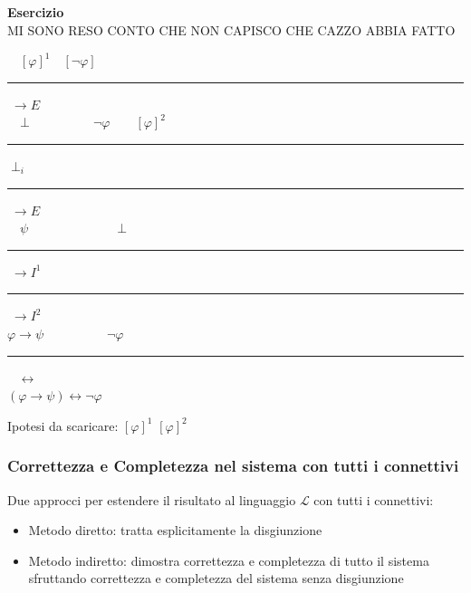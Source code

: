 \documentclass[a4paper, 12pt]{book}
\newcommand{\esercizio}[2][]{%
  \vspace{5pt}%
  \begin{tcolorbox}[%
    colback=white,          %
    colframe=black!70,      %
    arc=2mm,                %
    boxrule=0.5pt,          %
    left=4pt, right=4pt,    %
    top=2pt, bottom=2pt,    %
    breakable               %
  ]
  \noindent\textbf{Esercizio\ifthenelse{\equal{#1}{}}{}{ - #1}}\\[6pt]
  \hspace{1em}#2
  \end{tcolorbox}
  \vspace{5pt}%
}
\begin{document}
  \esercizio[5. $\lnot \varphi \vdash (\varphi \rightarrow \psi) \leftrightarrow \lnot \varphi$]{
  MI SONO RESO CONTO CHE NON CAPISCO CHE CAZZO ABBIA FATTO
  \begin{center}
    
    \(
    \hspace{1em} [\varphi]^1 \hspace{1em}[\lnot \varphi] \hspace{7em}
    \)\\[-0.5em]
    \rule{3cm}{0.4pt}\(\; \rightarrow E\)\hspace{1em}\\
    \(
    \hspace{1em} \bot \hspace{5em} \lnot \varphi \hspace{2em} [\varphi]^2
    \)\\[-0.5em]
    \hspace{1cm}\rule{2cm}{0.4pt}\(\; \bot_i\)\hspace{0.2cm}\rule{2cm}{0.4pt}\(\; \rightarrow E\)\\
    \(
    \hspace{1em} \psi \hspace{7em} \bot
    \)\\[-0.5em]
    \hspace{1cm}\rule{2cm}{0.4pt}\(\; \rightarrow I^1\)\hspace{0.2cm}\rule{2cm}{0.4pt}\(\; \rightarrow I^2\)\\
    \(
    \varphi \rightarrow \psi \hspace{5em} \lnot \varphi
    \)\\[-0.5em]
    \hspace{1cm}\rule{6.5cm}{0.4pt}\(\;\;\; \leftrightarrow \)\\  
    \(
    (\varphi \rightarrow \psi) \leftrightarrow \lnot \varphi
    \)\par
    \vspace{2em}
    Ipotesi da scaricare: $[\varphi]^1$ $[\varphi]^2$
    \end{center}
  }


\subsubsection*{Correttezza e Completezza nel sistema con tutti i connettivi}

Due approcci per estendere il risultato al linguaggio $\mathcal{L}$ con tutti i connettivi:  
\begin{itemize}
  \item Metodo diretto: tratta esplicitamente la disgiunzione
  \item Metodo indiretto: dimostra correttezza e completezza di tutto il sistema sfruttando correttezza e completezza del sistema senza disgiunzione
\end{itemize}
\end{document}
